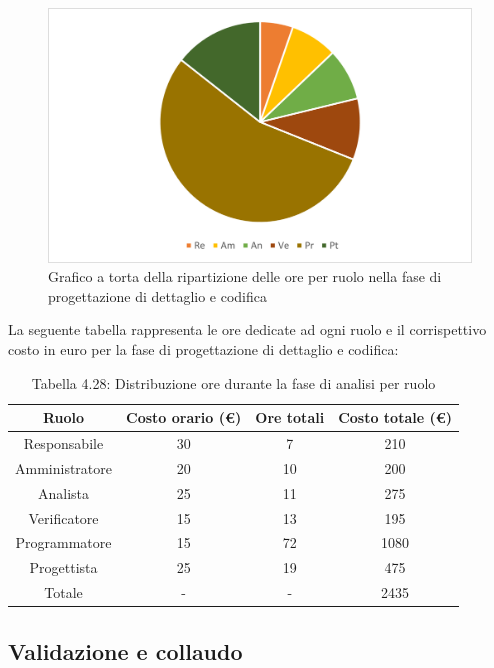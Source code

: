 \begin{figure}[H]
    \centering
    \includegraphics[scale=0.6]{img/grafi preventivo/torta/codifica/complessivo.png}
    \caption{Grafico a torta della ripartizione delle ore per ruolo nella fase di progettazione di dettaglio e codifica}
\end{figure}
La seguente tabella rappresenta le ore dedicate ad ogni ruolo e il corrispettivo costo in euro per la fase di progettazione di dettaglio e codifica:
\begin{table}[h]
	\setlength\extrarowheight{5pt}
	\centering
	\begin{tabularx}{\textwidth}{|ccc|c|}
		\hline
		\rowcolor{white}
		\textbf{Ruolo} & \textbf{Costo orario (€)} & \textbf{Ore totali} & \textbf{Costo totale (€)} \\
		\hline
		Responsabile &30&7&210 \\
		Amministratore &20&10&200 \\
		Analista &25&11&275 \\
		Verificatore &15&13&195 \\
		Programmatore &15&72&1080 \\
		Progettista &25&19&475 \\
		\hline
		Totale &-&-&2435 \\
		\hline
	\end{tabularx}
    \vspace{10pt}
	\caption{Tabella 4.28: Distribuzione ore durante la fase di analisi per ruolo}
\end{table}
\newpage
\subsection{Validazione e collaudo}

